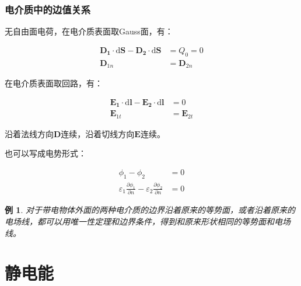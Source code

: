 \documentclass[12pt,onecolumn,a4paper]{book}
\newtheorem*{example}{例}
\numberwithin{table}{subsection}
\numberwithin{equation}{subsection}
\begin{document}
\subsection{电介质中的边值关系}

无自由面电荷，在电介质表面取Gauss面，有：

\begin{align}
    \mathbf{D_1} \cdot \mathrm{d} \mathbf{S} - \mathbf{D_2} \cdot \mathrm{d} \mathbf{S} & = Q_0 = 0         \\
    \mathbf{D}_{1n}                                                                     & = \mathbf{D}_{2n}
\end{align}

在电介质表面取回路，有：

\begin{align}
    \mathbf{E_1} \cdot \mathrm{d} \mathbf{l} - \mathbf{E_2} \cdot \mathrm{d} \mathbf{l} & = 0               \\
    \mathbf{E}_{1t}                                                                     & = \mathbf{E}_{2t}
\end{align}

沿着法线方向$\mathbf{D}$连续，沿着切线方向$\mathbf{E}$连续。

也可以写成电势形式：

\begin{align}
    \phi_1 - \phi_2                                                                                   & = 0 \\
    \varepsilon_1\frac{\partial \phi_1}{\partial n} - \varepsilon_2\frac{\partial \phi_2}{\partial n} & = 0
\end{align}

\begin{example}
    对于带电物体外面的两种电介质的边界沿着原来的等势面，或者沿着原来的电场线，都可以用唯一性定理和边界条件，得到和原来形状相同的等势面和电场线。
\end{example}

\chapter{静电能}
\end{document}
